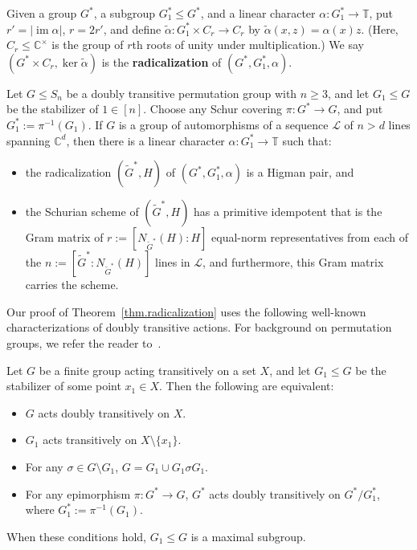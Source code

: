 \begin{definition}
\label{defn:radicalization}
Given a group $G^*$, a subgroup $G^*_1 \leq G^*$, and a linear character $\alpha \colon G_1^* \to \mathbb{T}$, put $r' =|\operatorname{im}\alpha|$, $r=2r'$, and define $\widetilde{\alpha}\colon G^*_1 \times C_r\to C_r$ by $\widetilde{\alpha}(x,z)=\alpha(x)z$.
(Here, $C_r \leq \mathbb{C}^\times$ is the group of $r$th roots of unity under multiplication.)
We say $(G^*\times C_r,\operatorname{ker}\widetilde{\alpha})$ is the \textbf{radicalization} of $(G^*,G^*_1,\alpha)$.
\end{definition}


\begin{theorem}
\label{thm.radicalization}
Let $G \leq S_n$ be a doubly transitive permutation group with $n \geq 3$, and let $G_1\leq G$ be the stabilizer of $1 \in [n]$.
Choose any Schur covering $\pi\colon G^* \to G$, and put $G^*_1:=\pi^{-1}(G_1)$.
If $G$ is a group of automorphisms of a sequence $\mathscr{L}$ of $n > d$ lines spanning $\mathbb{C}^d$, then there is a linear character $\alpha \colon G_1^* \to \mathbb{T}$ such that:
\begin{itemize}
\item[(a)]
the radicalization $(\widetilde{G}^*,H)$ of $(G^*,G^*_1,\alpha)$ is a Higman pair, and
\item[(b)]
the Schurian scheme of $(\widetilde{G}^*,H)$ has a primitive idempotent that is the Gram matrix of $r:=[N_{\widetilde{G}^*}(H):H]$ equal-norm representatives from each of the $n:=[\widetilde{G}^*:N_{\widetilde{G}^*}(H)]$ lines in $\mathscr{L}$, and furthermore, this Gram matrix carries the scheme.
\end{itemize}
\end{theorem}


Our proof of Theorem~\ref{thm.radicalization} uses the following well-known characterizations of doubly transitive actions.
For background on permutation groups, we refer the reader to~\cite{DixonMortimer:96}.

\begin{proposition}
\label{prop: char of 2tran}
Let $G$ be a finite group acting transitively on a set $X$, and let $G_1 \leq G$ be the stabilizer of some point $x_1 \in X$.
Then the following are equivalent:
\begin{itemize}
\item[(a)]
$G$ acts doubly transitively on $X$.
\item[(b)]
$G_1$ acts transitively on $X\setminus \{x_1\}$.
\item[(c)]
For any $\sigma \in G \setminus G_1$, $G = G_1 \cup G_1 \sigma G_1$.
\item[(d)]
For any epimorphism $\pi \colon G^* \to G$, $G^*$ acts doubly transitively on $G^*/G_1^*$, where $G_1^* := \pi^{-1}(G_1)$.
\end{itemize}
When these conditions hold, $G_1 \leq G$ is a maximal subgroup.
\end{proposition}


